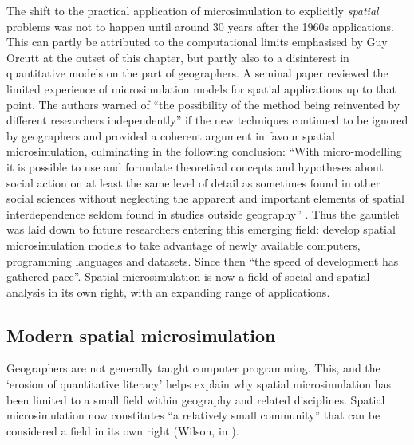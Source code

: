 The shift to the practical application of microsimulation to explicitly
\emph{spatial} problems was not to happen until around 30 years after the
1960s applications. This can partly be attributed to the
computational limits emphasised by Guy Orcutt at the outset of this chapter, but
partly also to a disinterest in quantitative models on the part of geographers.
A seminal paper \citep{Holm1987} reviewed the limited experience of
microsimulation models for
spatial applications up to that point. The authors warned of ``the
possibility of the method being reinvented by different
researchers independently'' if the new techniques continued to be ignored by
geographers \citep[p.~145]{Holm1987} and provided a coherent argument in favour
spatial microsimulation, culminating in the following conclusion:
``With micro-modelling it is possible to use and formulate theoretical concepts
and hypotheses about social action on at least the same level of detail as
sometimes found in other social sciences  without neglecting the apparent and
important elements of spatial interdependence seldom found in studies outside
geography'' \citep[p.~163]{Holm1987}.
Thus the gauntlet was laid down to future
researchers entering this emerging field: develop spatial microsimulation models
to take advantage of newly available computers, programming languages and
datasets. Since then ``the speed of development has gathered
pace''\citep[p.~259]{clarke2013conclusions}. Spatial microsimulation is now a
field of social and spatial analysis in its own right, with an expanding range
of applications. 

\subsection{Modern spatial microsimulation}
Geographers are not generally taught computer programming.
This, and the `erosion of quantitative literacy' \citep{ESRC2013}
helps explain why spatial microsimulation has been limited to a
small field within geography and related disciplines. Spatial
microsimulation now constitutes ``a relatively small
community'' that can be considered a field in its own right
(Wilson, in \citealp[p.~vi]{Tanton2013}).


